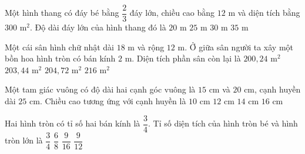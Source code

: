 \begin{ex} %
Một hình thang có đáy bé bằng $\dfrac{2}{3}$ đáy lớn, chiều cao bằng $12\text{ m}$ và diện tích bằng $300\text{ m}^2$. Độ dài đáy lớn của hình thang đó là
\choice
{$20\text{ m}$}
{$25\text{ m}$}
{\True $30\text{ m}$}
{$35\text{ m}$}
\end{ex}

\begin{ex} %
Một cái sân hình chữ nhật dài $18\text{ m}$ và rộng $12\text{ m}$. Ở giữa sân người ta xây một bồn hoa hình tròn có bán kính $2\text{ m}$. Diện tích phần sân còn lại là
\choice
{$200{,}24\text{ m}^2$}
{\True $203{,}44\text{ m}^2$}
{$204{,}72\text{ m}^2$}
{$216\text{ m}^2$}
\end{ex}

\begin{ex} %
Một tam giác vuông có độ dài hai cạnh góc vuông là $15\text{ cm}$ và $20\text{ cm}$, cạnh huyền dài $25\text{ cm}$. Chiều cao tương ứng với cạnh huyền là
\choice
{$10\text{ cm}$}
{\True $12\text{ cm}$}
{$14\text{ cm}$}
{$16\text{ cm}$}
\end{ex}

\begin{ex} %
Hai hình tròn có tỉ số hai bán kính là $\dfrac{3}{4}$. Tỉ số diện tích của hình tròn bé và hình tròn lớn là
\choice
{$\dfrac{3}{4}$}
{$\dfrac{6}{8}$}
{\True $\dfrac{9}{16}$}
{$\dfrac{9}{12}$}
\end{ex}

